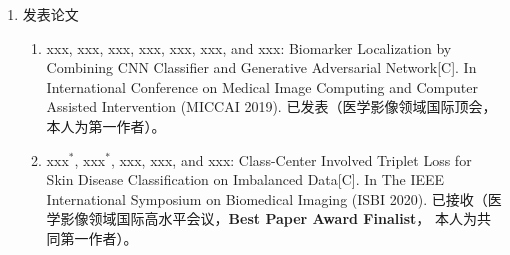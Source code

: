 \begin{enumerate}
	\item {\heiti 发表论文}
	\begin{enumerate}
		\item xxx, xxx, xxx, xxx, xxx, xxx, and xxx: Biomarker Localization by Combining CNN Classifier and Generative Adversarial Network[C]. In International Conference on Medical Image Computing and Computer Assisted Intervention (MICCAI 2019). {\heiti 已发表（医学影像领域国际顶会，本人为第一作者）}。
		\item xxx$^*$, xxx$^*$, xxx, xxx, and xxx: Class-Center Involved Triplet Loss  for Skin Disease Classification on Imbalanced Data[C]. In The IEEE International Symposium on Biomedical Imaging (ISBI 2020). {\heiti 已接收（医学影像领域国际高水平会议}，\textbf{Best Paper Award Finalist}， {\heiti 本人为共同第一作者）}。
	\end{enumerate}
	
\end{enumerate}